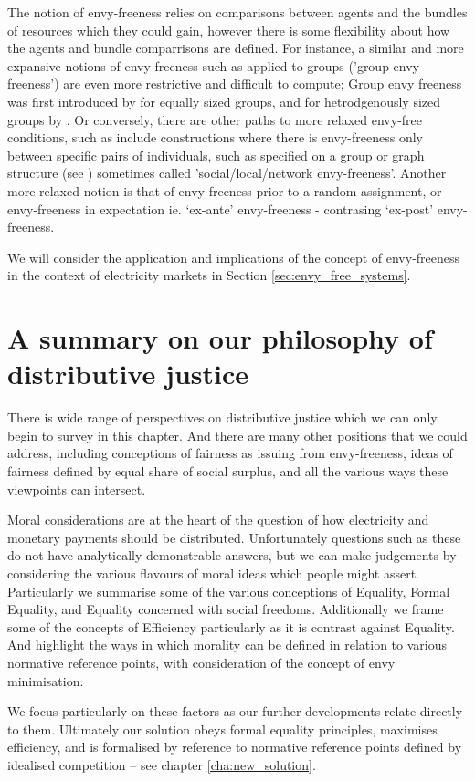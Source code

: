The notion of envy-freeness relies on comparisons between agents and the bundles of resources which they could gain, however there is some flexibility about how the agents and bundle comparrisons are defined.
For instance, a similar and more expansive notions of envy-freeness such as applied to groups ('group envy freeness') are even more restrictive and difficult to compute; Group envy freeness was first introduced by \cite{BERLIANT1992201} for equally sized groups, and for hetrodgenously sized groups by \cite{DBLP:conf/aaai/ConitzerF0V19}.
Or conversely, there are other paths to more relaxed envy-free conditions, such as include constructions where there is envy-freeness only between specific pairs of individuals, such as specified on a group or graph structure (see \cite{FLAMMINI20191}) sometimes called 'social/local/network envy-freeness'.
Another more relaxed notion is that of envy-freeness prior to a random assignment, or envy-freeness in expectation ie. `ex-ante' envy-freeness - contrasing `ex-post' envy-freeness.

We will consider the application and implications of the concept of envy-freeness in the context of electricity markets in Section \ref{sec:envy_free_systems}.


\section{A summary on our philosophy of distributive justice}


There is wide range of perspectives on distributive justice which we can only begin to survey in this chapter.
And there are many other positions that we could address, including conceptions of fairness as issuing from envy-freeness, ideas of fairness defined by equal share of social surplus, and all the various ways these viewpoints can intersect.%

Moral considerations are at the heart of the question of how electricity and monetary payments should be distributed.
Unfortunately questions such as these do not have analytically demonstrable answers, but we can make judgements by considering the various flavours of moral ideas which people might assert.
Particularly we summarise some of the various conceptions of Equality, Formal Equality, and Equality concerned with social freedoms.
Additionally we frame some of the concepts of Efficiency particularly as it is contrast against Equality.
And highlight the ways in which morality can be defined in relation to various normative reference points, with consideration of the concept of envy minimisation.

We focus particularly on these factors as our further developments relate directly to them.
Ultimately our solution obeys formal equality principles, maximises efficiency, and is formalised by reference to normative reference points defined by idealised competition -- see chapter \ref{cha:new_solution}.




